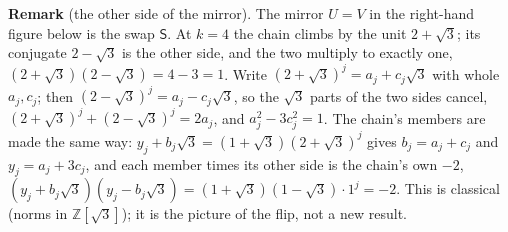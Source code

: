 \documentclass[11pt]{article}
\begin{document}
\medskip
\noindent\textbf{Remark} (the other side of the mirror). The mirror $U=V$ in the right-hand figure below is the swap $\mathsf{S}$. At $k=4$ the chain climbs by the unit $2+\sqrt3$; its conjugate $2-\sqrt3$ is the other side, and the two multiply to exactly one, $(2+\sqrt3)(2-\sqrt3)=4-3=1$. Write $(2+\sqrt3)^j=a_j+c_j\sqrt3$ with whole $a_j,c_j$; then $(2-\sqrt3)^j=a_j-c_j\sqrt3$, so the $\sqrt3$ parts of the two sides cancel, $(2+\sqrt3)^j+(2-\sqrt3)^j=2a_j$, and $a_j^2-3c_j^2=1$. The chain's members are made the same way: $y_j+b_j\sqrt3=(1+\sqrt3)(2+\sqrt3)^j$ gives $b_j=a_j+c_j$ and $y_j=a_j+3c_j$, and each member times its other side is the chain's own $-2$, $(y_j+b_j\sqrt3)(y_j-b_j\sqrt3)=(1+\sqrt3)(1-\sqrt3)\cdot1^j=-2$. This is classical (norms in $\mathbb{Z}[\sqrt3]$); it is the picture of the flip, not a new result.
\end{document}
